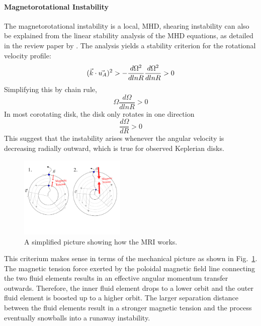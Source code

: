 \documentclass[iop,revtex4]{emulateapj}
\begin{document}
\paragraph*{\rm{\textbf{Magnetorotational Instability}\\}}
The magnetorotational instability is a local, \ac{MHD}, shearing instability can also be explained from the linear stability analysis of the \ac{MHD} equations, as detailed in the review paper by \cite{Balbus:1998A}. The analysis yields a stability criterion for the rotational velocity profile: 
\begin{equation}
(\vec{k}\cdot\vec{u_A})^2> -\frac{d\Omega^2}{d ln R}
\\ \frac{d\Omega^2}{d ln R}>0
\end{equation}
 Simplifying this by chain rule, 
\begin{equation}
\Omega \frac{d\Omega}{d ln R}>0
\end{equation}
In most corotating disk, the disk only rotates in one direction
\begin{equation}
 \frac{d\Omega}{d R}>0
\end{equation}
This suggest that the instability arises whenever the angular velocity is decreasing radially outward, which is true for observed Keplerian disks.
\begin{figure}[ht]
\includegraphics[width=0.45\textwidth,trim=0 100  0 50]{plots/mri_cartoon.pdf}
\caption{A simplified picture showing how the \ac{MRI} works.}
\label{mri_cartoon}
\end{figure}
\par This criterium makes sense in terms of the mechanical picture as shown in Fig.~\ref{mri_cartoon}. The magnetic tension force exerted by the poloidal magnetic field line connecting the two fluid elements results in an effective angular momentum transfer outwards. Therefore, the inner fluid element drops to a lower orbit and the  outer fluid element is boosted up to a higher orbit. The larger separation distance between the fluid elements result in a stronger magnetic tension and the process eventually snowballs into a runaway instability.
\end{document}
